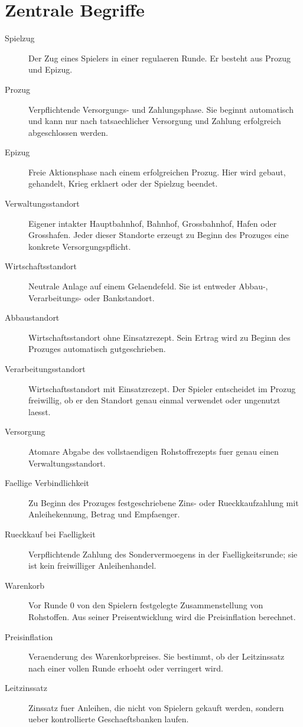 \documentclass[11pt,a4paper,oneside,parskip=half]{scrreprt}
\begin{document}
\section{Zentrale Begriffe}
\begin{description}
  \item[Spielzug] Der Zug eines Spielers in einer regulaeren Runde. Er besteht aus Prozug und Epizug.
  \item[Prozug] Verpflichtende Versorgungs- und Zahlungsphase. Sie beginnt automatisch und kann nur nach tatsaechlicher Versorgung und Zahlung erfolgreich abgeschlossen werden.
  \item[Epizug] Freie Aktionsphase nach einem erfolgreichen Prozug. Hier wird gebaut, gehandelt, Krieg erklaert oder der Spielzug beendet.
  \item[Verwaltungsstandort] Eigener intakter Hauptbahnhof, Bahnhof, Grossbahnhof, Hafen oder Grosshafen. Jeder dieser Standorte erzeugt zu Beginn des Prozuges eine konkrete Versorgungspflicht.
  \item[Wirtschaftsstandort] Neutrale Anlage auf einem Gelaendefeld. Sie ist entweder Abbau-, Verarbeitungs- oder Bankstandort.
  \item[Abbaustandort] Wirtschaftsstandort ohne Einsatzrezept. Sein Ertrag wird zu Beginn des Prozuges automatisch gutgeschrieben.
  \item[Verarbeitungsstandort] Wirtschaftsstandort mit Einsatzrezept. Der Spieler entscheidet im Prozug freiwillig, ob er den Standort genau einmal verwendet oder ungenutzt laesst.
  \item[Versorgung] Atomare Abgabe des vollstaendigen Rohstoffrezepts fuer genau einen Verwaltungsstandort.
  \item[Faellige Verbindlichkeit] Zu Beginn des Prozuges festgeschriebene Zins- oder Rueckkaufzahlung mit Anleihekennung, Betrag und Empfaenger.
  \item[Rueckkauf bei Faelligkeit] Verpflichtende Zahlung des Sondervermoegens in der Faelligkeitsrunde; sie ist kein freiwilliger Anleihenhandel.
  \item[Warenkorb] Vor Runde 0 von den Spielern festgelegte Zusammenstellung von Rohstoffen. Aus seiner Preisentwicklung wird die Preisinflation berechnet.
  \item[Preisinflation] Veraenderung des Warenkorbpreises. Sie bestimmt, ob der Leitzinssatz nach einer vollen Runde erhoeht oder verringert wird.
  \item[Leitzinssatz] Zinssatz fuer Anleihen, die nicht von Spielern gekauft werden, sondern ueber kontrollierte Geschaeftsbanken laufen.

\end{description}
\end{document}

